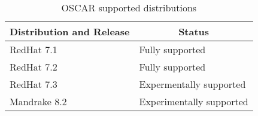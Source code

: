 %
%
%

\begin{table}[htbp]
  \begin{center}
    \begin{tabular}{|l|p{3in}|}
      \hline
      \multicolumn{1}{|c|}{Distribution and Release} &
      \multicolumn{1}{|c|}{Status} \\
      \hline
      \hline
      RedHat 7.1 & Fully supported \\
%
      RedHat 7.2 & Fully supported \\
%
      RedHat 7.3 & Expermentally supported \\
%
\hline
%
      Mandrake 8.2 & Experimentally supported \\
      \hline
    \end{tabular}
    \caption{OSCAR supported distributions}
    \label{tab:oscar-distro-support}
  \end{center}
\end{table}
